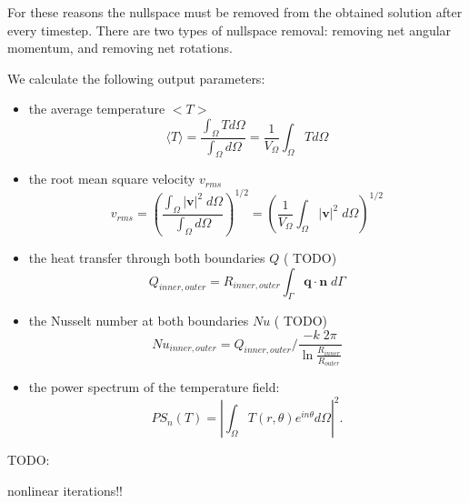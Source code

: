 For these reasons the nullspace must be removed from the obtained solution after every timestep.
There are two types of nullspace removal: removing net angular momentum, and removing net rotations.




We calculate the following output parameters: 
\begin{itemize}
\item the average temperature $<T>$
\begin{equation}
\langle T \rangle = \frac{\int_\Omega T  d\Omega }{\int_\Omega d \Omega }
=\frac{1}{V_\Omega}\int_\Omega T d\Omega
\end{equation}
\item the root mean square velocity $v_{rms}$
\begin{equation}
v_{rms} = \left ( \frac{\int_\Omega |{\bm v}|^2 \;  d \Omega}{\int_\Omega d\Omega }  \right )^{1/2}
=\left ( \frac{1}{V_\Omega} \int_\Omega |{\bm v}|^2 \;  d \Omega \right )^{1/2}
\end{equation}
\item the heat transfer through both boundaries $Q$ ({\color{red} TODO}) 
\begin{equation}
Q_{inner, outer} = R_{inner, outer} \int_\Gamma \boldsymbol{q} \cdot \boldsymbol{{n}} \; d\Gamma 
\end{equation}
\item the Nusselt number at both boundaries $Nu$  ({\color{red} TODO}) 
\begin{equation}
Nu_{inner, outer} = Q_{inner, outer} \bigg / \frac{-k \; 2 \pi}{\ln{\frac{R_{inner}}{R_{outer}}}}
\end{equation}
\item the power spectrum of the temperature field:
\begin{equation}
PS_n(T) = \left |\int_\Omega T(r, \theta) e^{in\theta} d\Omega \right |^2.
\end{equation}
\end{itemize}







TODO:

nonlinear iterations!!
